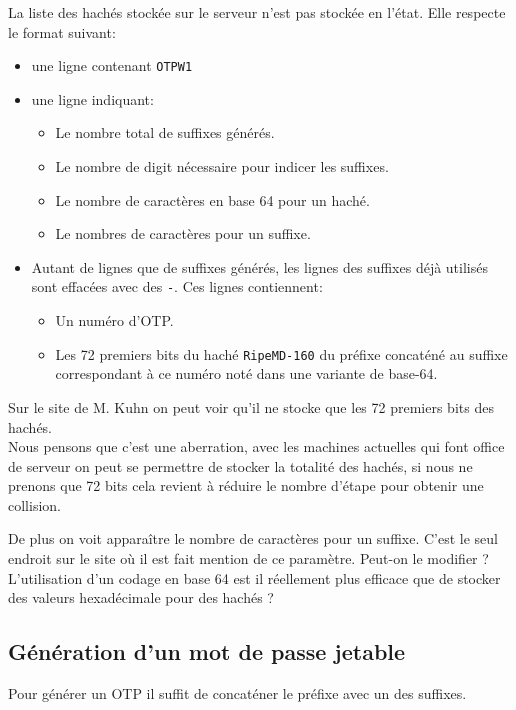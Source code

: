\documentclass{../res/univ-projet}
\begin{document}
    La liste des hachés stockée sur le serveur n'est pas stockée en l'état. Elle respecte
    le format suivant:
    \begin{itemize}
        \item une ligne contenant \verb?OTPW1?
        \item une ligne indiquant:
            \begin{itemize}
                \item Le nombre total de suffixes générés.
                \item Le nombre de digit nécessaire pour indicer les suffixes.
                \item Le nombre de caractères en base 64 pour un haché.
                \item Le nombres de caractères pour un suffixe.
            \end{itemize}
        \item Autant de lignes que de suffixes générés, les lignes des
            suffixes déjà utilisés sont effacées avec des \verb?-?.
            Ces lignes contiennent:
            \begin{itemize}
                \item Un numéro d'OTP.
                \item Les 72 premiers bits du haché \verb?RipeMD-160? du préfixe concaténé
                    au suffixe correspondant à ce numéro noté dans une variante de base-64.
            \end{itemize}
    \end{itemize}
    Sur le site de M. Kuhn on peut voir qu'il ne stocke que les 72 premiers bits des hachés.\\
    Nous pensons que c'est une aberration, avec les machines actuelles qui font office de serveur
    on peut se permettre de stocker la totalité des hachés, si nous ne prenons que 72 bits
    cela revient à réduire le nombre d'étape pour obtenir une collision.
    
    De plus on voit apparaître le nombre de caractères pour un suffixe. C'est le seul endroit
    sur le site où il est fait mention de ce paramètre. Peut-on le modifier ?\\
    L'utilisation d'un codage en base 64 est il réellement plus efficace que de stocker
    des valeurs hexadécimale pour des hachés ?




\subsection{Génération d'un mot de passe jetable}
    Pour générer un OTP il suffit de concaténer le préfixe avec un des suffixes.
\end{document}
